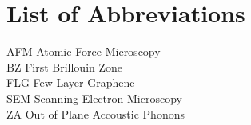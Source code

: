 \chapter*{List of Abbreviations}

\noindent

AFM \hfill Atomic Force Microscopy \\

BZ \hfill First Brillouin Zone \\

FLG \hfill Few Layer Graphene \\

SEM \hfill Scanning Electron Microscopy \\

ZA \hfill Out of Plane Accoustic Phonons

\newpage